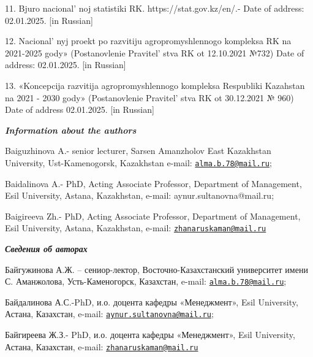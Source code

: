 \begin{references}
11. Bjuro nacional' noj statistiki RK.
https://stat.gov.kz/en/.- Date of address: 02.01.2025. {[}in Russian{]}

12. Nacional' nyj proekt po razvitiju agropromyshlennogo
kompleksa RK na 2021-2025 gody» (Postanovlenie
Pravitel' stva RK ot 12.10.2021 №732) Date of address:
02.01.2025. {[}in Russian{]}

13. «Koncepcija razvitija agropromyshlennogo kompleksa Respubliki
Kazahstan na 2021 - 2030 gody» (Postanovlenie
Pravitel' stva RK ot 30.12.2021 № 960) Date of address
02.01.2025. {[}in Russian{]}
\end{references}

\begin{authorinfo}
\emph{{\bfseries Information about the authors}}

Baiguzhinova A.- senior lecturer, Sarsen Amanzholov East Kazakhstan
University, Ust-Kamenogorsk, Kazakhstan e-mail:
\href{mailto:alma.b.78@mail.ru}{\nolinkurl{alma.b.78@mail.ru}};

Baidalinova A.- PhD, Acting Associate Professor, Department of
Management, Esil University, Astana, Kazakhstan, e-mail:
aynur.sultanovna@mail.ru;

Baigireeva Zh.- PhD, Acting Associate Professor, Department of
Management, Esil University, Astana, Kazakhstan, e-mail:
\href{mailto:zhanaruskaman@mail.ru}{\nolinkurl{zhanaruskaman@mail.ru}}

\emph{{\bfseries Сведения об авторах}}

Байгужинова А.Ж. -- сениор-лектор, Восточно-Казахстанский университет
имени С. Аманжолова, Усть-Каменогорск, Казахстан, e-mail:
\href{mailto:alma.b.78@mail.ru}{\nolinkurl{alma.b.78@mail.ru}};

Байдалинова А.С.-PhD, и.о. доцента кафедры «Менеджмент», Esil
University, Астана, Казахстан, e-mail:
\href{mailto:aynur.sultanovna@mail.ru}{\nolinkurl{aynur.sultanovna@mail.ru}};

Байгиреева Ж.З.- PhD, и.о. доцента кафедры «Менеджмент», Esil
University, Астана, Казахстан, e-mail:
\href{mailto:zhanaruskaman@mail.ru}{\nolinkurl{zhanaruskaman@mail.ru}}
\end{authorinfo}
